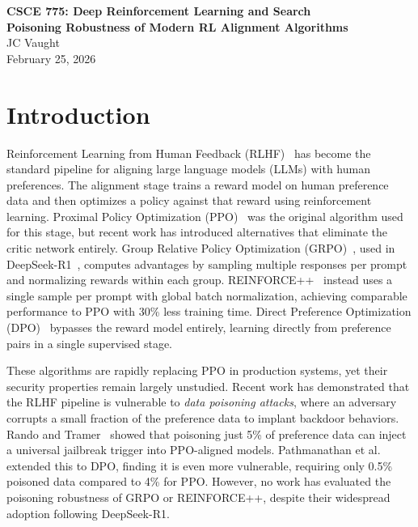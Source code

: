 \documentclass[12pt]{article}
\begin{document}
\begin{center}
{\large \textbf{CSCE 775: Deep Reinforcement Learning and Search}} \\[12pt]
{\Large \textbf{Poisoning Robustness of Modern RL Alignment Algorithms}} \\[12pt]
JC Vaught \\[6pt]
February 25, 2026
\end{center}

\section{Introduction}

Reinforcement Learning from Human Feedback (RLHF)~\cite{Ouyang2022InstructGPT} has become the standard pipeline for aligning large language models (LLMs) with human preferences. The alignment stage trains a reward model on human preference data and then optimizes a policy against that reward using reinforcement learning. Proximal Policy Optimization (PPO)~\cite{Schulman2017PPO} was the original algorithm used for this stage, but recent work has introduced alternatives that eliminate the critic network entirely. Group Relative Policy Optimization (GRPO)~\cite{Shao2024DeepSeekMath}, used in DeepSeek-R1~\cite{Guo2025DeepSeekR1}, computes advantages by sampling multiple responses per prompt and normalizing rewards within each group. REINFORCE++~\cite{Hu2025Reinforce} instead uses a single sample per prompt with global batch normalization, achieving comparable performance to PPO with 30\% less training time. Direct Preference Optimization (DPO)~\cite{Rafailov2023DPO} bypasses the reward model entirely, learning directly from preference pairs in a single supervised stage.

These algorithms are rapidly replacing PPO in production systems, yet their security properties remain largely unstudied. Recent work has demonstrated that the RLHF pipeline is vulnerable to \textit{data poisoning attacks}, where an adversary corrupts a small fraction of the preference data to implant backdoor behaviors. Rando and Tramer~\cite{Rando2024Universal} showed that poisoning just 5\% of preference data can inject a universal jailbreak trigger into PPO-aligned models. Pathmanathan et al.~\cite{Pathmanathan2025Poisoning} extended this to DPO, finding it is even more vulnerable, requiring only 0.5\% poisoned data compared to 4\% for PPO. However, no work has evaluated the poisoning robustness of GRPO or REINFORCE++, despite their widespread adoption following DeepSeek-R1.
\end{document}
